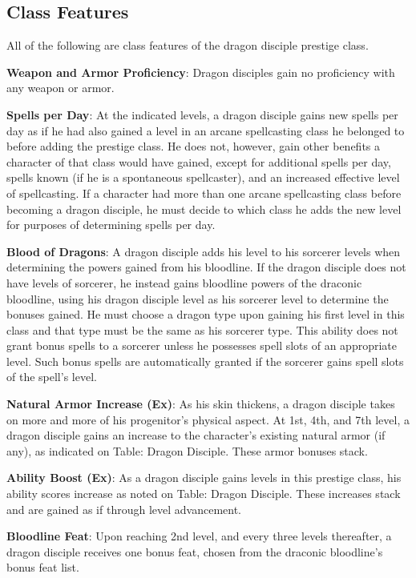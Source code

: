 				
\subsection{Class Features}

				
All of the following are class features of the dragon disciple prestige class.
				
\textbf{Weapon and Armor Proficiency}: Dragon disciples gain no proficiency with any weapon or armor.
				
\textbf{Spells per Day}: At the indicated levels, a dragon disciple gains new spells per day as if he had also gained a level in an arcane spellcasting class he belonged to before adding the prestige class. He does not, however, gain other benefits a character of that class would have gained, except for additional spells per day, spells known (if he is a spontaneous spellcaster), and an increased effective level of spellcasting. If a character had more than one arcane spellcasting class before becoming a dragon disciple, he must decide to which class he adds the new level for purposes of determining spells per day.
				
\textbf{Blood of Dragons}: A dragon disciple adds his level to his sorcerer levels when determining the powers gained from his bloodline. If the dragon disciple does not have levels of sorcerer, he instead gains bloodline powers of the draconic bloodline, using his dragon disciple level as his sorcerer level to determine the bonuses gained. He must choose a dragon type upon gaining his first level in this class and that type must be the same as his sorcerer type. This ability does not grant bonus spells to a sorcerer unless he possesses spell slots of an appropriate level. Such bonus spells are automatically granted if the sorcerer gains spell slots of the spell's level.
				
\textbf{Natural Armor Increase (Ex)}: As his skin thickens, a dragon disciple takes on more and more of his progenitor's physical aspect. At 1st, 4th, and 7th level, a dragon disciple gains an increase to the character's existing natural armor (if any), as indicated on Table: Dragon Disciple. These armor bonuses stack. 
				
\textbf{Ability Boost (Ex)}: As a dragon disciple gains levels in this prestige class, his ability scores increase as noted on Table: Dragon Disciple. These increases stack and are gained as if through level advancement.
				
\textbf{Bloodline Feat}: Upon reaching 2nd level, and every three levels thereafter, a dragon disciple receives one bonus feat, chosen from the draconic bloodline's bonus feat list.
				
